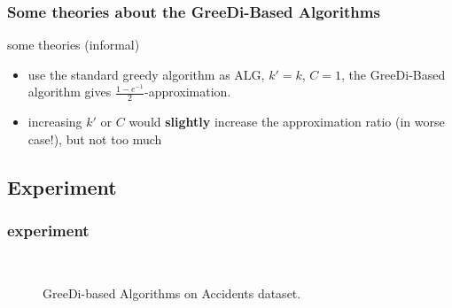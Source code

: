 \documentclass{beamer}
\newcommand{\alg}{\text{ALG}}
\begin{document}
\begin{frame}
  \frametitle{Some theories about the {\sc GreeDi}-Based Algorithms}
  \begin{block}{some theories (informal)}
    \begin{itemize}
    \item use the standard greedy algorithm as $\alg$, $k' = k$, $C = 1$, the {\sc GreeDi}-Based algorithm gives $\frac{1-e^{-1}}{2}$-approximation.
    \item increasing $k'$ or $C$ would \textbf{slightly} increase the approximation ratio (in worse case!), but not too much
    \end{itemize}
  \end{block}
  
\end{frame}

\subsection{Experiment}

\begin{frame}
  \frametitle{experiment}
  \begin{figure}[h!]
     \centering
     ~~
     \caption{{\sc GreeDi}-based Algorithms on {\sc Accidents} dataset.}
     \label{fig:distributed-accidents}
\end{figure}

\end{frame}
\end{document}
